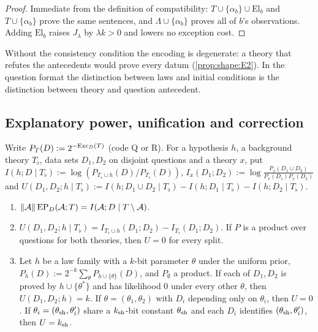 \begin{proof}
Immediate from the definition of compatibility: $T\cup\{\alpha_b\}\cup\mathrm{El}_b$ and $T\cup\{\alpha_b\}$ prove the same sentences, and $\Lambda\cup\{\alpha_b\}$ proves all of $b$'s observations. Adding $\mathrm{El}_b$ raises $J_\lambda$ by $\lambda k>0$ and lowers no exception cost.
\end{proof}

Without the consistency condition the encoding is degenerate: a theory that refutes the antecedents would prove every datum (\cref{prop:shape:E2}). In the question format the distinction between laws and initial conditions is the distinction between theory and question antecedent.

\subsection{Explanatory power, unification and correction}\label{app:laws:explain}

\begin{proposition}\label{prop:laws:EP}
Write $P_T(D):=2^{-\mathrm{Exc}_D(T)}$ (code Q or R). For a hypothesis $h$, a background theory $T_\flat$, data sets $D_1,D_2$ on disjoint questions and a theory $x$, put $I(h;D\mid T_\flat):=\log(P_{T_\flat\cup h}(D)/P_{T_\flat}(D))$, $I_x(D_1;D_2):=\log\frac{P_x(D_1\cup D_2)}{P_x(D_1)P_x(D_2)}$ and $U(D_1,D_2;h\mid T_\flat):=I(h;D_1\cup D_2\mid T_\flat)-I(h;D_1\mid T_\flat)-I(h;D_2\mid T_\flat)$.
\begin{enumerate}[label=(\alph*),itemsep=1pt,topsep=2pt]
\item $\lVert\mathcal A\rVert\,\mathrm{EP}_D(\mathcal A;T)=I(\mathcal A;D\mid T\setminus\mathcal A)$.
\item $U(D_1,D_2;h\mid T_\flat)=I_{T_\flat\cup h}(D_1;D_2)-I_{T_\flat}(D_1;D_2)$. If $P$ is a product over questions for both theories, then $U=0$ for every split.
\item Let $h$ be a law family with a $k$-bit parameter $\theta$ under the uniform prior, $P_h(D):=2^{-k}\sum_\theta P_{h\cup\{\theta\}}(D)$, and $P_\emptyset$ a product. If each of $D_1,D_2$ is proved by $h\cup\{\theta^*\}$ and has likelihood $0$ under every other $\theta$, then $U(D_1,D_2;h)=k$. If $\theta=(\theta_1,\theta_2)$ with $D_i$ depending only on $\theta_i$, then $U=0$. If $\theta_i=(\theta_{\rm sh},\theta'_i)$ share a $k_{\rm sh}$-bit constant $\theta_{\rm sh}$ and each $D_i$ identifies $(\theta_{\rm sh},\theta'_i)$, then $U=k_{\rm sh}$.
\end{enumerate}
\end{proposition}

